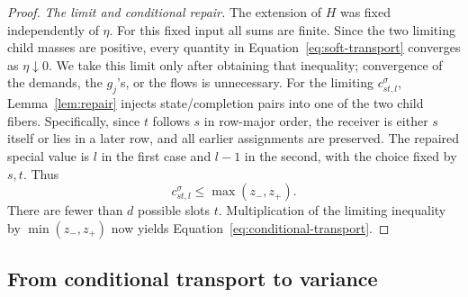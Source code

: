 \begin{proof}
\emph{The limit and conditional repair.}
The extension of $H$ was fixed independently of $\eta$. For this fixed
input all sums are finite.  Since the two limiting
child masses are positive, every quantity in
Equation~\eqref{eq:soft-transport} converges as $\eta\downarrow0$.
We take this limit only after obtaining that inequality; convergence
of the demands, the $g_j$'s, or the flows is unnecessary.
For the limiting $c_{st,l}^\sigma$, Lemma~\ref{lem:repair} injects
state/completion pairs into one of the two child fibers.  Specifically,
since $t$ follows $s$ in row-major order, the receiver is either $s$
itself or lies in a later row, and all earlier assignments are preserved.
The repaired special value is $l$ in the first case and $l-1$ in the
second, with the choice fixed by $s,t$.  Thus
\[
 c_{st,l}^\sigma\le\max(z_-,z_+).
\]
There are fewer than $d$ possible slots $t$.  Multiplication of the
limiting inequality by $\min(z_-,z_+)$ now yields
Equation~\eqref{eq:conditional-transport}.
\end{proof}

\subsection{From conditional transport to variance}

